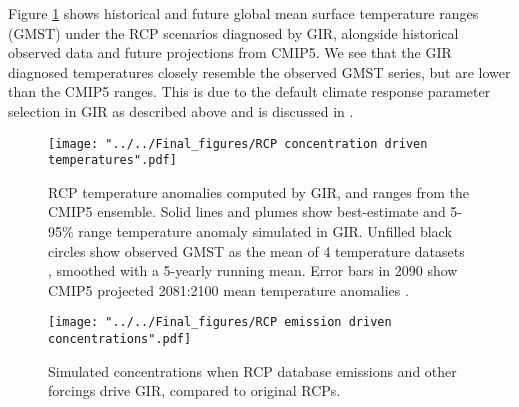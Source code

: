 \documentclass[gmd, manuscript]{copernicus}
\begin{document}
Figure \ref{fig:RCPtemps} shows historical and future global mean surface temperature ranges (GMST) under the RCP scenarios diagnosed by GIR, alongside historical observed data and future projections from CMIP5. We see that the GIR diagnosed temperatures closely resemble the observed GMST series, but are lower than the CMIP5 ranges. This is due to the default climate response parameter selection in GIR as described above and is discussed in \cite{Richardson2016}.
\begin{figure}[t]
    \texttt{[image: "../../Final\_figures/RCP concentration driven temperatures".pdf]}
    \caption{RCP temperature anomalies computed by GIR, and ranges from the CMIP5 ensemble. Solid lines and plumes show best-estimate and 5-95\% range temperature anomaly simulated in GIR. Unfilled black circles show observed GMST as the mean of 4 temperature datasets \citep{Vose2012,Cowtan2014,Lenssen2019,Morice2011}, smoothed with a 5-yearly running mean. Error bars in 2090 show CMIP5 projected 2081:2100 mean temperature anomalies \citep{Collins2013}.}
    \label{fig:RCPtemps}
\end{figure}
\begin{figure}[t]
    \texttt{[image: "../../Final\_figures/RCP emission driven concentrations".pdf]}
    \caption{Simulated concentrations when RCP database emissions and other forcings drive GIR, compared to original RCPs.}
    \label{fig:RCPconcs}
\end{figure}








\end{document}
